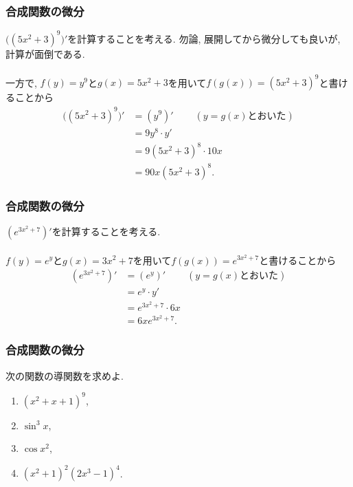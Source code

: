 \begin{frame}
\frametitle{合成関数の微分}


$\big((5x^2+3)^9\big)'$を計算することを考える. 
勿論, 展開してから微分しても良いが, 計算が面倒である. \\
\ \\

一方で, $f(y)=y^9$と$g(x)=5x^2+3$を用いて$f(g(x))=(5x^2+3)^9$と書けることから
\begin{align*} 
\big((5x^2+3)^9\big)' &= (y^9)'  \ \ \ \ \ \ \ \ \ \ (y=g(x)\text{とおいた})\\
& =9y^8 \cdot y' \\
&=9(5x^2+3)^8 \cdot 10x \\
&= 90x(5x^2+3)^8. 
\end{align*}
\end{frame}





\begin{frame}
\frametitle{合成関数の微分}


$(e^{3x^2+7})'$を計算することを考える. \\
\ \\

$f(y)=e^y$と$g(x)=3x^2+7$を用いて$f(g(x))=e^{3x^2+7}$と書けることから
\begin{align*} 
(e^{3x^2+7})' &= (e^y)'  \ \ \ \ \ \ \ \ \ \ (y=g(x)\text{とおいた})\\
& =e^y \cdot y' \\
&=e^{3x^2+7} \cdot 6x \\
&= 6x e^{3x^2+7}. 
\end{align*}


\end{frame}





\begin{frame}
\frametitle{合成関数の微分}


\begin{Prob}
次の関数の導関数を求めよ. 
\begin{enumerate}
\item $(x^2+x+1)^9$, 
\item $\sin^3 x$, 
\item $\cos x^2$, 
\item $(x^2+1)^2(2x^3-1)^4$. 
\end{enumerate}
\end{Prob}


\end{frame}




